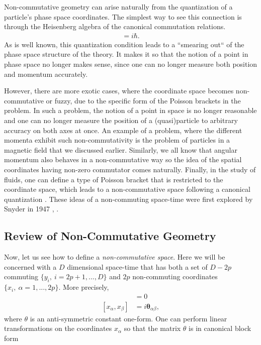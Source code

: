     Non-commutative geometry can arise naturally from the quantization of a particle's phase space coordinates. The simplest way to see this connection is through the Heisenberg algebra of the canonical commutation relations. 
    \begin{align}
        [\hat{x}, \hat{p}] = i \hbar.
    \end{align}
    As is well known, this quantization condition leads to a ``smearing out`` of the phase space structure of the theory. It makes it so that the notion of a point in phase space no longer makes sense, since one can no longer measure both position and momentum accurately.

    However, there are more exotic cases, where the coordinate space becomes non-commutative or fuzzy, due to the specific form of the Poisson brackets in the problem. In such a problem, the notion of a point in space is no longer reasonable and one can no longer measure the position of a (quasi)particle to arbitrary accuracy on both axes at once. An example of a problem, where the different momenta exhibit such non-commutativity is the problem of particles in a magnetic field that we discussed earlier. Similarly, we all know that angular momentum also behaves in a non-commutative way so the idea of the spatial coordinates having non-zero commutator comes naturally. Finally, in the study of fluids, one can define a type of Poisson bracket that is restricted to the coordinate space, which leads to a non-commutative space following a canonical quantization \cite{Jackiw2002}. These ideas of a non-commuting space-time were first explored by Snyder in 1947 \cite{Snyder1947_space_time}, \cite{Snyder1947_EM}.


    \subsection{Review of Non-Commutative Geometry}
    Now, let us see how to define a \textit{non-commutative space}. Here we will be concerned with a $D$ dimensional space-time that has both a set of $D-2p$ commuting $\{ y_i, \ i=2p+1,...,D\}$ and $2p$ non-commuting coordinates $\{ x_i, \ \alpha =1,...,2p\}$. More precisely,
    \begin{align}
        [y_i, y_j] &=0\\
        [x_{\alpha}, x_{\beta}] &=i \bm{\theta}_{\alpha \beta}, \label{eq:space_time_commutations}
    \end{align}
    where $\theta$ is an anti-symmetric constant one-form. One can perform linear transformations on the coordinates $x_{\alpha}$ so that the matrix $\theta$ is in canonical block form

